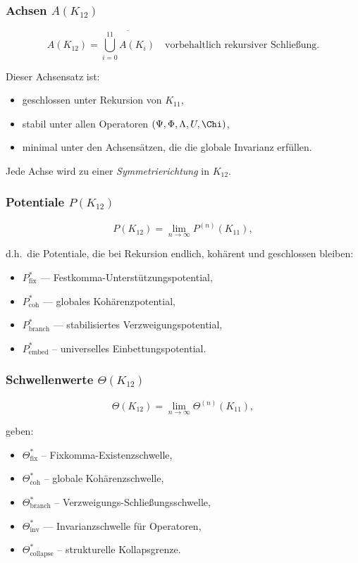 \subsubsection{Achsen $A(K_{12})$}

\[
A(K_{12}) =
\overline{\bigcup_{i=0}^{11} A(K_i)}
\quad \text{vorbehaltlich rekursiver Schließung}.
\]

Dieser Achsensatz ist:
\begin{itemize}
    \item geschlossen unter Rekursion von $K_{11}$,
    \item stabil unter allen Operatoren $(\Psi,\Phi,\Lambda,U,\Chi)$,
    \item minimal unter den Achsensätzen, die die globale Invarianz erfüllen.
\end{itemize}

Jede Achse wird zu einer \emph{Symmetrierichtung} in $K_{12}$.

\subsubsection{Potentiale $P(K_{12})$}

\[
P(K_{12}) = \lim_{n\to\infty} P^{(n)}(K_{11}),
\]

d.h.\ die Potentiale, die bei Rekursion endlich, kohärent und geschlossen bleiben:
\begin{itemize}
    \item $P_{\mathrm{fix}}^*$ — Festkomma-Unterstützungspotential,
    \item $P_{\mathrm{coh}}^*$ — globales Kohärenzpotential,
    \item $P_{\mathrm{branch}}^*$ — stabilisiertes Verzweigungspotential,
    \item $P_{\mathrm{embed}}^*$ – universelles Einbettungspotential.
\end{itemize}

\subsubsection{Schwellenwerte $\Theta(K_{12})$}

\[
\Theta(K_{12}) =
\lim_{n\to\infty} \Theta^{(n)}(K_{11}),
\]

geben:
\begin{itemize}
    \item $\Theta^*_{\mathrm{fix}}$ – Fixkomma-Existenzschwelle,
    \item $\Theta^*_{\mathrm{coh}}$ – globale Kohärenzschwelle,
    \item $\Theta^*_{\mathrm{branch}}$ – Verzweigungs-Schließungsschwelle,
    \item $\Theta^*_{\mathrm{inv}}$ — Invarianzschwelle für Operatoren,
    \item $\Theta^*_{\mathrm{collapse}}$ – strukturelle Kollapsgrenze.
\end{itemize}

